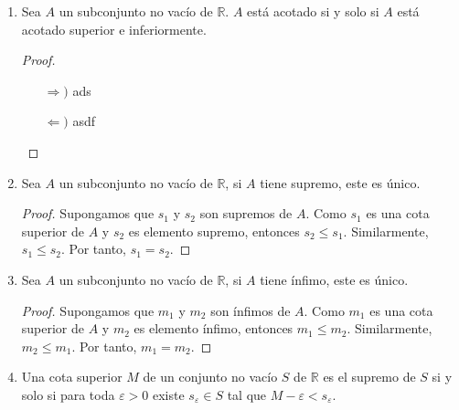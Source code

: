 \documentclass[11pt]{article}
\newcommand{\R}{\mathbb{R}}
\begin{document}
\begin{enumerate}
    \item Sea $A$ un subconjunto no vacío de $\R$. $A$ está acotado si y solo si $A$ está acotado superior e inferiormente.
    
    \vspace{-1em}\begin{proof} \leavevmode
        \begin{itemize}
            \item[$\Rightarrow)$] ads
            \item[$\Leftarrow)$] asdf
        \end{itemize}
    \end{proof} \vspace{-1em}

    \item Sea $A$ un subconjunto no vacío de $\R$, si $A$ tiene supremo, este es único.
    
    \vspace{-1em}\begin{proof} 
        Supongamos que $s_1$ y $s_2$ son supremos de $A$. Como $s_1$ es una cota superior de $A$ y $s_2$ es elemento supremo, entonces $s_2\leq s_1$. Similarmente, $s_1\leq s_2$. Por tanto, $s_1=s_2$.    
    \end{proof} \vspace{-1em}

    \item Sea $A$ un subconjunto no vacío de $\R$, si $A$ tiene ínfimo, este es único.
    
    \vspace{-1em}\begin{proof} 
        Supongamos que $m_1$ y $m_2$ son ínfimos de $A$. Como $m_1$ es una cota superior de $A$ y $m_2$ es elemento ínfimo, entonces $m_1\leq m_2$. Similarmente, $m_2\leq m_1$. Por tanto, $m_1=m_2$.    
    \end{proof} \vspace{-1em}

    \item Una cota superior $M$ de un conjunto no vacío $S$ de $\R$ es el supremo de $S$ si y solo si para toda $\varepsilon>0$ existe $s_\varepsilon \in S$ tal que $M-\varepsilon<s_\varepsilon$.


\end{enumerate}
\end{document}
